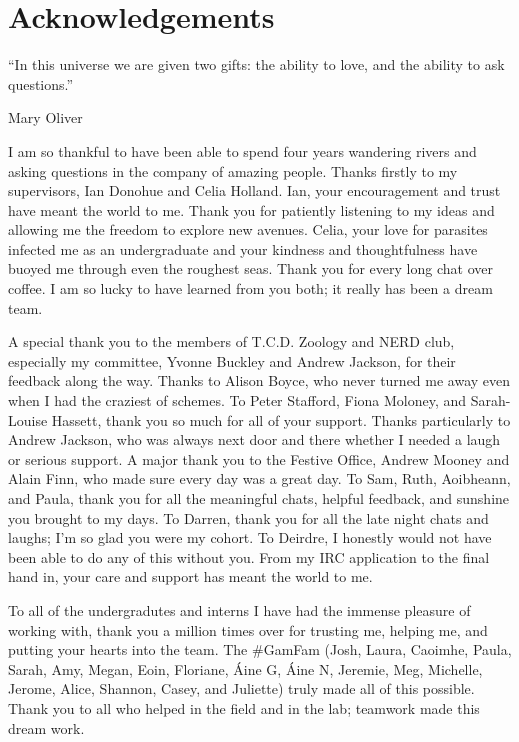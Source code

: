 \chapter*{Acknowledgements}  

\begin{quoteshrink}
  ``In this universe we are given two gifts: the ability to love, and the ability to ask questions.''

\hfill{Mary Oliver}
\end{quoteshrink}

{\small I am so thankful to have been able to spend four years wandering rivers and asking questions in the company of amazing people. Thanks firstly to my supervisors, Ian Donohue and Celia Holland. Ian, your encouragement and trust have meant the world to me. Thank you for patiently listening to my ideas and allowing me the freedom to explore new avenues. Celia, your love for parasites infected me as an undergraduate and your kindness and thoughtfulness have buoyed me through even the roughest seas. Thank you for every long chat over coffee. I am so lucky to have learned from you both; it really has been a dream team.}

{\small A special thank you to the members of T.C.D. Zoology and NERD club, especially my committee, Yvonne Buckley and Andrew Jackson, for their feedback along the way. Thanks to Alison Boyce, who never turned me away even when I had the craziest of schemes. To Peter Stafford, Fiona Moloney, and Sarah-Louise Hassett, thank you so much for all of your support. Thanks particularly to Andrew Jackson, who was always next door and there whether I needed a laugh or serious support. A major thank you to the Festive Office, Andrew Mooney and Alain Finn, who made sure every day was a great day. To Sam, Ruth, Aoibheann, and Paula, thank you for all the meaningful chats, helpful feedback, and sunshine you brought to my days. To Darren, thank you for all the late night chats and laughs; I'm so glad you were my cohort. To Deirdre, I honestly would not have been able to do any of this without you. From my IRC application to the final hand in, your care and support has meant the world to me.}

{\small To all of the undergradutes and interns I have had the immense pleasure of working with, thank you a million times over for trusting me, helping me, and putting your hearts into the team. The \#GamFam (Josh, Laura, Caoimhe, Paula, Sarah, Amy, Megan, Eoin, Floriane, Áine G, Áine N, Jeremie, Meg, Michelle, Jerome, Alice, Shannon, Casey, and Juliette) truly made all of this possible. Thank you to all who helped in the field and in the lab; teamwork made this dream work.}

